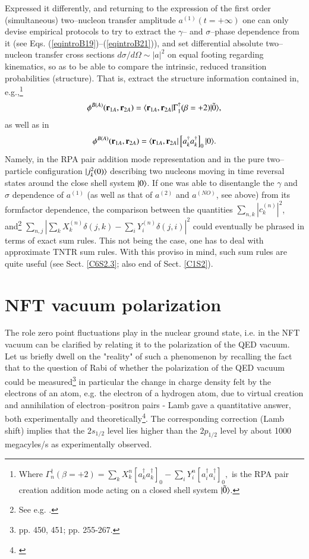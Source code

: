 \begin{subappendices}
 
 Expressed it differently, and returning to the expression of the first order (simultaneous) two--nucleon transfer amplitude $a^{(1)}(t=+\infty)$ one can only devise empirical protocols to try to extract the $\gamma$-- and $\sigma$--phase dependence  from it (see Eqs. (\ref{eqintroB19})--(\ref{eqintroB21})), and set differential absolute two--nucleon transfer cross sections $d\sigma/d\Omega\sim |a|^2$ on equal footing regarding kinematics, so as to be able to compare the intrinsic, reduced transition probabilities (structure). That is, extract the structure information contained in, e.g.,\footnote{Where
 	$\Gamma_n^\dagger(\beta=+2)=\sum_k X_k^n\left[a^\dagger_ka^\dagger_k\right]_0-\sum_i Y^n_i \left[a^\dagger_i a^\dagger_i\right]_0,$
 	is the RPA pair creation addition mode acting on  a closed shell system $|{\tilde 0} \rangle$. }
 \begin{align}
 \phi^{B(A)}(\mathbf r_{1A},\mathbf r_{2A})=\langle {\mathbf r_{1A},\mathbf r_{2A}|\Gamma^\dagger_1(\beta=+2)|\tilde 0} \rangle,
 \end{align}
 as well as in
 \begin{align}
 \phi^{B(A)}(\mathbf r_{1A},\mathbf r_{2A})=\langle {\mathbf r_{1A},\mathbf r_{2A}}|\left[a^\dagger_ka^\dagger_k\right]_0|{0} \rangle.
 \end{align}
 Namely, in the RPA pair addition mode representation and in the pure two--particle configuration $|{j^2_k(0)} \rangle$ describing two nucleons moving in time reversal states around the close shell system $|{0} \rangle$. If one was able to disentangle the $\gamma$ and $\sigma$ dependence of $a^{(1)}$ (as well as that of $a^{(2)}$ and $a^{(NO)}$, see above) from its formfactor dependence, the comparison between the quantities $\sum_{n,k}|c^{(n)}_k|^2$, and\footnote{See e.g. \cite{Broglia:67}.} $\sum_{n,j}\left|\sum_kX^{(n)}_k\delta(j,k)-\sum_iY^{(n)}_i\delta(j,i)\right|^2$ could  eventually be phrased in terms of exact sum rules. This not being  the case, one has to  deal with approximate TNTR sum rules. With this proviso in mind, such sum rules are quite useful (see Sect. \ref{C6S2.3}; also end of Sect. \ref{C1S2}). 
 
 
 \section{NFT vacuum polarization}\label{App1.E}
 The role zero point fluctuations play in the nuclear ground state, i.e. in the NFT vacuum  can
 be  clarified by relating it to the polarization of the QED vacuum.
 Let us briefly dwell on the "reality" of such a phenomenon by recalling the fact that
 to the question of Rabi of whether the polarization of the QED vacuum could be measured\footnote{\cite{Pais:86} pp. 450, 451; \cite{Pais:00} pp. 255-267.} in particular
 the change in charge  density felt by the electrons of an atom,  e.g. the electron of a hydrogen atom, due to
 virtual creation and annihilation of electron--positron pairs - Lamb gave a quantitative answer, both experimentally
 and theoretically\footnote{\cite{Lamb:47,Kroll:49}}. The corresponding correction  (Lamb shift) implies that the $2s_{1/2}$ level lies 
 higher than the $2p_{1/2}$ level by about 1000 megacyles/s  as experimentally observed.
 

\end{subappendices}
